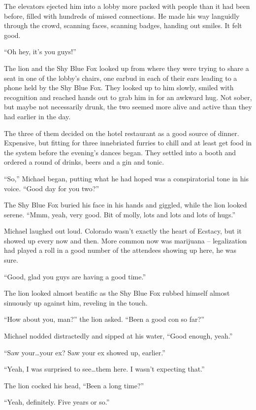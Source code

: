 The elevators ejected him into a lobby more packed with people than it had been before, filled with hundreds of missed connections.  He made his way languidly through the crowd, scanning faces, scanning badges, handing out smiles.  It felt good.

``Oh hey, it's you guys!''

The lion and the Shy Blue Fox looked up from where they were trying to share a seat in one of the lobby's chairs, one earbud in each of their ears leading to a phone held by the Shy Blue Fox.  They looked up to him slowly, smiled with recognition and reached hands out to grab him in for an awkward hug.  Not sober, but maybe not necessarily drunk, the two seemed more alive and active than they had earlier in the day.

The three of them decided on the hotel restaurant as a good source of dinner.  Expensive, but fitting for three innebriated furries to chill and at least get food in the system before the evening's dances began.  They settled into a booth and ordered a round of drinks, beers and a gin and tonic.

``So,'' Michael began, putting what he had hoped was a conspiratorial tone in his voice.  ``Good day for you two?''

The Shy Blue Fox buried his face in his hands and giggled, while the lion looked serene.  ``Mmm, yeah, very good.  Bit of molly, lots and lots and lots of hugs.''

Michael laughed out loud.  Colorado wasn't exactly the heart of Ecstacy, but it showed up every now and then.  More common now was marijuana -- legalization had played a roll in a good number of the attendees showing up here, he was sure.

``Good, glad you guys are having a good time.''

The lion looked almost beatific as the Shy Blue Fox rubbed himself almost sinuously up against him, reveling in the touch.

``How about you, man?'' the lion asked.  ``Been a good con so far?''

Michael nodded distractedly and sipped at his water, ``Good enough, yeah.''

``Saw your\ldots{}your ex?  Saw your ex showed up, earlier.''

``Yeah, I was surprised to see\ldots{}them here.  I wasn't expecting that.''

The lion cocked his head, ``Been a long time?''

``Yeah, definitely.  Five years or so.''

